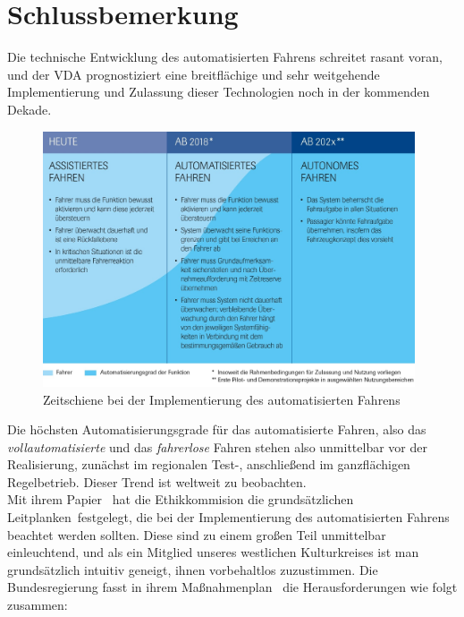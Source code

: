 \documentclass[twoside,a4paper,12pt]{article}
\begin{document}
\newpage

\cleardoublepage
\section{Schlussbemerkung}

Die technische Entwicklung des automatisierten Fahrens schreitet rasant voran, und der VDA prognostiziert eine breitflächige und sehr weitgehende Implementierung
und Zulassung dieser Technologien noch in der kommenden Dekade.\\

\begin{figure}[H]
\centering
\includegraphics[width=11cm]{resources/zeitschiene-automatisierungsgrade.jpg}
\caption[Zeitschiene bei der Implementierung des automatisierten Fahrens]{Zeitschiene bei der Implementierung des automatisierten Fahrens~\cite{vda}}
\label{figure:ZeitschieneAutomatisierungsgrade}
\end{figure}

Die höchsten Automatisierungsgrade für das automatisierte Fahren, also das \textit{vollautomatisierte} und das \textit{fahrerlose} Fahren stehen also unmittelbar
vor der Realisierung, zunächst im regionalen Test-, anschließend im ganzflächigen Regelbetrieb. Dieser Trend ist weltweit zu beobachten.\\

Mit ihrem Papier~\cite{ek} hat die Ethikkommision die grundsätzlichen \glqq Leitplanken\grqq\ festgelegt, die bei der Implementierung des automatisierten Fahrens
beachtet werden sollten. Diese sind zu einem großen Teil unmittelbar einleuchtend, und als ein Mitglied unseres westlichen Kulturkreises ist man grundsätzlich
intuitiv geneigt, ihnen vorbehaltlos zuzustimmen. Die Bundesregierung fasst in ihrem Maßnahmenplan~\cite{bmvi5} die Herausforderungen wie folgt zusammen:
\end{document}
